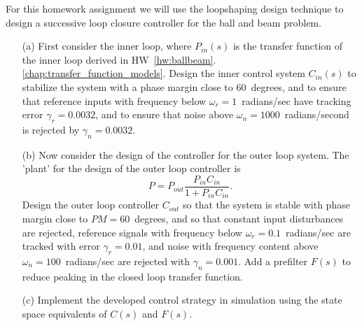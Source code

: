 For this homework assignment we will use the loopshaping design technique to design a successive loop closure controller for the ball and beam problem.
\begin{itemize}
	\item[(a)] First consider the inner loop, where $P_{in}(s)$ is the transfer function of the inner loop derived in HW~\ref{hw:ballbeam}.\ref{chap:transfer_function_models}.  Design the inner control system $C_{in}(s)$ to stabilize the system with a phase margin close to 60~degrees, and to ensure that reference inputs with frequency below $\omega_r=1$~radians/sec have tracking error $\gamma_r=0.0032$, and to ensure that noise above $\omega_n=1000$~radians/second is rejected by $\gamma_n=0.0032$.  
	\item[(b)] Now consider the design of the controller for the outer loop system.  The 'plant' for the design of the outer loop controller is
		\[
		P = P_{out}\frac{P_{in}C_{in}}{1+P_{in}C_{in}}.
		\]
		Design the outer loop controller $C_{out}$ so that the system is stable with phase margin close to $PM=60$~degrees, and so that constant input disturbances are rejected, reference signals with frequency below $\omega_r=0.1$~radians/sec are tracked with error $\gamma_r=0.01$, and noise with frequency content above $\omega_n=100$~radians/sec are rejected with $\gamma_n=0.001$.
		Add a prefilter $F(s)$ to reduce peaking in the closed loop transfer function.
	\item[(c)]  Implement the developed control strategy in simulation using the state space equivalents of $C(s)$ and $F(s)$.
\end{itemize}
